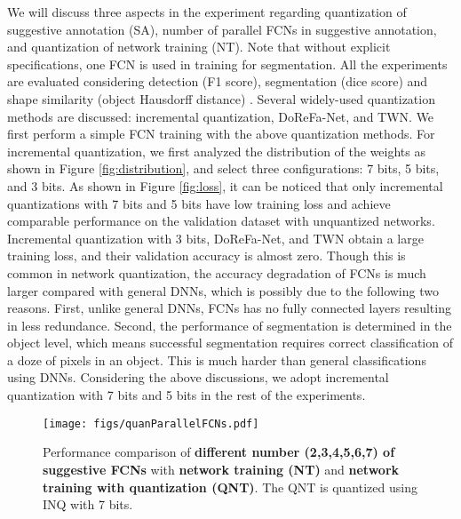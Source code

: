 \documentclass[10pt,twocolumn,letterpaper]{article}
\begin{document}
We will discuss three aspects in the experiment regarding quantization of suggestive annotation (SA), number of parallel FCNs in suggestive annotation, and quantization of network training (NT).
Note that without explicit specifications, one FCN is used in training for segmentation.
All the experiments are evaluated considering detection (F1 score), segmentation (dice score) and shape similarity (object Hausdorff distance) \cite{sirinukunwattana2017gland}.
Several widely-used quantization methods are discussed: incremental quantization, DoReFa-Net, and TWN.
We first perform a simple FCN training with the above quantization methods.
For incremental quantization, we first analyzed the distribution of the weights as shown in Figure \ref{fig:distribution}, and select three configurations: 7 bits, 5 bits, and 3 bits.
As shown in Figure \ref{fig:loss}, it can be noticed that only incremental quantizations with 7 bits and 5 bits have low training loss and achieve comparable performance on the validation dataset with unquantized networks.
Incremental quantization with 3 bits, DoReFa-Net, and TWN obtain a large training loss, and their validation accuracy is almost zero.
Though this is common in network quantization, the accuracy degradation of FCNs is much larger compared with general DNNs, which is possibly due to the following two reasons.
First, unlike general DNNs, FCNs has no fully connected layers resulting in less redundance.
Second, the performance of segmentation is determined in the object level, which means successful segmentation requires correct classification of a doze of pixels in an object.
This is much harder than general classifications using DNNs.
Considering the above discussions, we adopt incremental quantization with 7 bits and 5 bits in the rest of the experiments.



\begin{figure*}[!htbp]
\begin{center}
\centerline{\texttt{[image: figs/quanParallelFCNs.pdf]}}
\end{center}
   \vspace{-25pt}
   \caption{Performance comparison of \textbf{different number (2,3,4,5,6,7) of suggestive FCNs} with \textbf{network training (NT)} and \textbf{network training with quantization (QNT)}. The QNT is quantized using INQ with 7 bits.
   }
\label{fig:parallel}
\end{figure*}
\end{document}
